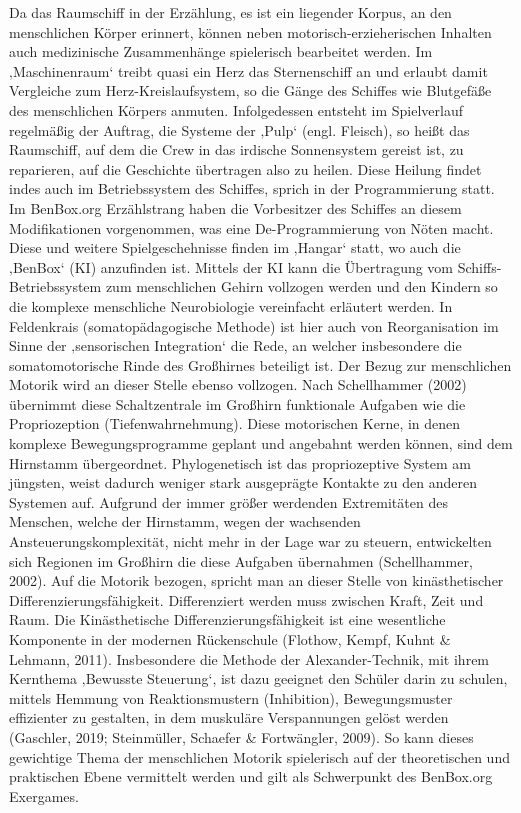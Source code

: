 \documentclass[
  a4paper,
  DIV=11,
  numbers=noendperiod,
  onecolumn,
  oneside,
  a4paper]{scrartcl}
\begin{document}
Da das Raumschiff in der Erzählung, es ist ein liegender Korpus, an den
menschlichen Körper erinnert, können neben motorisch-erzieherischen
Inhalten auch medizinische Zusammenhänge spielerisch bearbeitet werden.
Im ‚Maschinenraum` treibt quasi ein Herz das Sternenschiff an und
erlaubt damit Vergleiche zum Herz-Kreislaufsystem, so die Gänge des
Schiffes wie Blutgefäße des menschlichen Körpers anmuten. Infolgedessen
entsteht im Spielverlauf regelmäßig der Auftrag, die Systeme der ‚Pulp`
(engl. Fleisch), so heißt das Raumschiff, auf dem die Crew in das
irdische Sonnensystem gereist ist, zu reparieren, auf die Geschichte
übertragen also zu heilen. Diese Heilung findet indes auch im
Betriebssystem des Schiffes, sprich in der Programmierung statt. Im
BenBox.org Erzählstrang haben die Vorbesitzer des Schiffes an diesem
Modifikationen vorgenommen, was eine De-Programmierung von Nöten macht.
Diese und weitere Spielgeschehnisse finden im ‚Hangar` statt, wo auch
die ‚BenBox` (KI) anzufinden ist. Mittels der KI kann die Übertragung
vom Schiffs-Betriebssystem zum menschlichen Gehirn vollzogen werden und
den Kindern so die komplexe menschliche Neurobiologie vereinfacht
erläutert werden. In Feldenkrais (somatopädagogische Methode) ist hier
auch von Reorganisation im Sinne der ‚sensorischen Integration` die
Rede, an welcher insbesondere die somatomotorische Rinde des Großhirnes
beteiligt ist. Der Bezug zur menschlichen Motorik wird an dieser Stelle
ebenso vollzogen. Nach Schellhammer (2002) übernimmt diese
Schaltzentrale im Großhirn funktionale Aufgaben wie die Propriozeption
(Tiefenwahrnehmung). Diese motorischen Kerne, in denen komplexe
Bewegungsprogramme geplant und angebahnt werden können, sind dem
Hirnstamm übergeordnet. Phylogenetisch ist das propriozeptive System am
jüngsten, weist dadurch weniger stark ausgeprägte Kontakte zu den
anderen Systemen auf. Aufgrund der immer größer werdenden Extremitäten
des Menschen, welche der Hirnstamm, wegen der wachsenden
Ansteuerungskomplexität, nicht mehr in der Lage war zu steuern,
entwickelten sich Regionen im Großhirn die diese Aufgaben übernahmen
(Schellhammer, 2002). Auf die Motorik bezogen, spricht man an dieser
Stelle von kinästhetischer Differenzierungsfähigkeit. Differenziert
werden muss zwischen Kraft, Zeit und Raum. Die Kinästhetische
Differenzierungsfähigkeit ist eine wesentliche Komponente in der
modernen Rückenschule (Flothow, Kempf, Kuhnt \& Lehmann, 2011).
Insbesondere die Methode der Alexander-Technik, mit ihrem Kernthema
‚Bewusste Steuerung`, ist dazu geeignet den Schüler darin zu schulen,
mittels Hemmung von Reaktionsmustern (Inhibition), Bewegungsmuster
effizienter zu gestalten, in dem muskuläre Verspannungen gelöst werden
(Gaschler, 2019; Steinmüller, Schaefer \& Fortwängler, 2009). So kann
dieses gewichtige Thema der menschlichen Motorik spielerisch auf der
theoretischen und praktischen Ebene vermittelt werden und gilt als
Schwerpunkt des BenBox.org Exergames.
\end{document}
